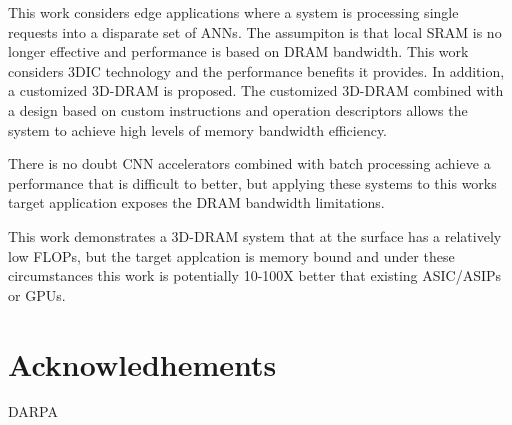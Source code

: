 \documentclass[journal]{IEEEtran}
\begin{document}
This work considers edge applications where a system is processing single requests into a disparate set of ANNs. The assumpiton is that local SRAM is no longer effective and performance is based on DRAM bandwidth.
This work considers 3DIC technology and the performance benefits it provides. In addition, a customized 3D-DRAM is proposed. The customized 3D-DRAM combined with a design based on custom instructions and operation descriptors
allows the system to achieve high levels of memory bandwidth efficiency.

There is no doubt CNN accelerators combined with batch processing achieve a performance that is difficult to better, but applying these systems to this works target application exposes the DRAM bandwidth limitations.

This work demonstrates a 3D-DRAM system that at the surface has a relatively low FLOPs, but the target applcation is memory bound and under these circumstances this work is potentially 10-100X better that existing ASIC/ASIPs or GPUs.

\section{Acknowledhements}
\label{sec:Acknowledhements}

DARPA

\iffalse
\end{document}

